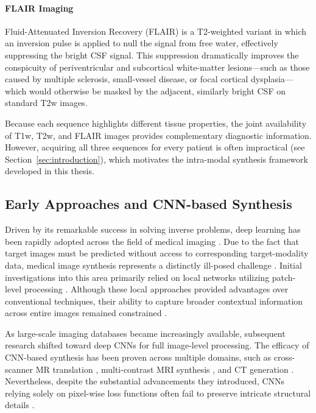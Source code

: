 \documentclass[11pt,a4paper]{article}
\begin{document}
\paragraph{FLAIR Imaging}
Fluid-Attenuated Inversion Recovery (FLAIR) is a T2-weighted variant in which an inversion pulse is applied to null the signal from free water, effectively suppressing the bright CSF signal. This suppression dramatically improves the conspicuity of periventricular and subcortical white-matter lesions---such as those caused by multiple sclerosis, small-vessel disease, or focal cortical dysplasia---which would otherwise be masked by the adjacent, similarly bright CSF on standard T2w images.
\medskip
 
Because each sequence highlights different tissue properties, the joint availability of T1w, T2w, and FLAIR images provides complementary diagnostic information. However, acquiring all three sequences for every patient is often impractical (see Section~\ref{sec:introduction}), which motivates the intra-modal synthesis framework developed in this thesis.

\subsection{Early Approaches and CNN-based Synthesis}
Driven by its remarkable success in solving inverse problems, deep learning has been rapidly adopted across the field of medical imaging \cite{review_1, review_2}. Due to the fact that target images must be predicted without access to corresponding target-modality data, medical image synthesis represents a distinctly ill-posed challenge \cite{nie2018}. Initial investigations into this area primarily relied on local networks utilizing patch-level processing \cite{hien2015, li2014, torrado2016}. Although these local approaches provided advantages over conventional techniques, their ability to capture broader contextual information across entire images remained constrained \cite{sevetlidis2016}.

As large-scale imaging databases became increasingly available, subsequent research shifted toward deep CNNs for full image-level processing. The efficacy of CNN-based synthesis has been proven across multiple domains, such as cross-scanner MR translation \cite{behrami2016, bahrami2016b, nie2018, zhang2019}, multi-contrast MRI synthesis \cite{bowles2016, chartsias2018, cordier2016, sevetlidis2016, joyce2017, wei2019}, and CT generation \cite{han2017, nie2016, arabi2018, klaser2019}. Nevertheless, despite the substantial advancements they introduced, CNNs relying solely on pixel-wise loss functions often fail to preserve intricate structural details \cite{pix2pix, cyclegan, pgan}.
\end{document}
